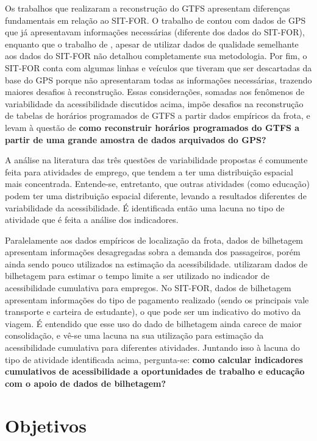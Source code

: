 \documentclass[        
    a4paper,          %
    12pt,             %
    chapter=TITLE,    %
    section=Title,    %
    subsection=Title, %
    oneside,          %
    english,          %
    spanish,          %
    brazil,           %
    fleqn             %
]{abntex2}
\begin{document}
  Os trabalhos que realizaram a reconstrução do GTFS apresentam diferenças fundamentais em relação ao SIT-FOR. O trabalho de \citet{Wessel2017} contou com dados de GPS que já apresentavam informações necessárias (diferente dos dados do SIT-FOR), enquanto que o trabalho de \citet{Arbex2016a}, apesar de utilizar dados de qualidade semelhante aos dados do SIT-FOR não detalhou completamente sua metodologia. Por fim, o SIT-FOR conta com algumas linhas e veículos que tiveram que ser descartadas da base do GPS porque não apresentaram todas as informações necessárias, trazendo maiores desafios à reconstrução. Essas considerações, somadas aos fenômenos de variabilidade da acessibilidade discutidos acima, impõe desafios na reconstrução de tabelas de horários programados de GTFS a partir dados empíricos da frota, e levam à questão de \textbf{como reconstruir horários programados do GTFS a partir de uma grande amostra de dados arquivados do GPS?}
  
  A análise na literatura das três questões de variabilidade propostas é comumente feita para atividades de emprego, que tendem a ter uma distribuição espacial mais concentrada. Entende-se, entretanto, que outras atividades (como educação) podem ter uma distribuição espacial diferente, levando a resultados diferentes de variabilidade da acessibilidade. É identificada então uma lacuna no tipo de atividade que é feita a análise dos indicadores.
  
  Paralelamente aos dados empíricos de localização da frota, dados de bilhetagem apresentam informações desagregadas sobra a demanda dos passageiros, porém ainda sendo pouco utilizados na estimação da acessibilidade. \citet{Arbex2016a} utilizaram dados de bilhetagem para estimar o tempo limite a ser utilizado no indicador de acessibilidade cumulativa para empregos. No SIT-FOR, dados de bilhetagem apresentam informações do tipo de pagamento realizado (sendo os principais vale transporte e carteira de estudante), o que pode ser um indicativo do motivo da viagem. É entendido que esse uso do dado de bilhetagem ainda carece de maior consolidação, e vê-se uma lacuna na sua utilização para estimação da acessibilidade cumulativa para diferentes atividades. Juntando isso à lacuna do tipo de atividade identificada acima, pergunta-se: \textbf{como calcular indicadores cumulativos de acessibilidade a oportunidades de trabalho e educação com o apoio de dados de bilhetagem?}
  
  \hypertarget{objetivos}{%
  \section{Objetivos}\label{objetivos}}
  
\end{document}
